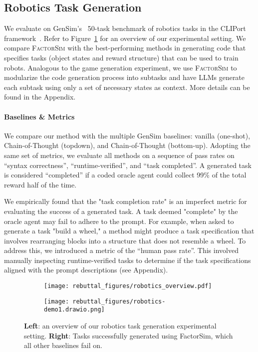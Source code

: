 \documentclass{article}
\theoremstyle{plain}
\theoremstyle{definition}
\theoremstyle{remark}
\newcommand{\method}{\textsc{FactorSim}\xspace}
\begin{document}
 \subsection{Robotics Task Generation}
We evaluate on GenSim's~\cite{wang2023gensim} 50-task benchmark of robotics tasks in the CLIPort framework~\cite{shridhar2021cliport}. Refer to Figure~\ref{fig:robotics_overview} for an overview of our experimental setting.
We compare \method{} with the best-performing methods in generating code that specifies tasks (object states and reward structure) that can be used to train robots. Analogous to the game generation experiment, we use \method to modularize the code generation process into subtasks and have LLMs generate each subtask using only a set of necessary states as context.  More details can be found in the Appendix.









\paragraph{Baselines \& Metrics}
We compare our method with the multiple GenSim baselines: vanilla (one-shot), Chain-of-Thought (topdown), and Chain-of-Thought (bottom-up). Adopting the same set of metrics, we evaluate all methods on a sequence of pass rates on ``syntax correctness'', ``runtime-verified'', and ``task completed''.
A generated task is considered ``completed'' if a coded oracle agent could collect 99\% of the total reward half of the time. 


We empirically found that the "task completion rate" is an imperfect metric for evaluating the success of a generated task. A task deemed "complete" by the oracle agent may fail to adhere to the prompt. For example, when asked to generate a task "build a wheel," a method might produce a task specification that involves rearranging blocks into a structure that does not resemble a wheel. To address this, we introduced a metric of the ``human pass rate''. This involved manually inspecting runtime-verified tasks to determine if the task specifications aligned with the prompt descriptions (see Appendix).


\begin{figure}[!t]
  \centering
  \begin{subfigure}[b]{0.48\linewidth}
    \centering
    \texttt{[image: rebuttal\_figures/robotics\_overview.pdf]}
\end{subfigure}
  \hfill
  \begin{subfigure}[b]{0.48\linewidth}
    \centering
    \texttt{[image: rebuttal\_figures/robotics-demo1.drawio.png]}
\end{subfigure}
  \caption{\textbf{Left}: an overview of our robotics task generation experimental setting. \textbf{Right}: Tasks successfully generated using FactorSim, which all other baselines fail on.}\label{fig:robotics_overview}
\end{figure}
\end{document}
